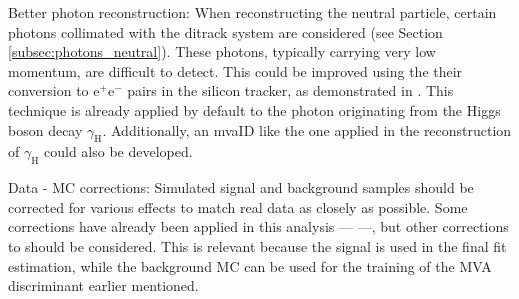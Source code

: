 \begin{myitemlist}
    \item[Better photon reconstruction:] When reconstructing the neutral particle, certain photons collimated with the ditrack system are considered (see Section \ref{subsec:photons_neutral}). These photons, typically carrying very low momentum, are difficult to detect. This could be improved using the their conversion to e$^+$e$^-$ pairs in the silicon tracker, as demonstrated in \cite{CMS:2018vgf}. This technique is already applied by default to the photon originating from the Higgs boson decay $\gamma_{\text{H}}$. Additionally, an mvaID like the one applied in the reconstruction of $\gamma_{\text{H}}$ could also be developed.
    
    \item[Data - MC corrections:] Simulated signal and background samples should be corrected for various effects to match real data as closely as possible. Some corrections have already been applied in this analysis ---  ---, but other corrections to  should be considered. This is relevant because the signal is used in the final fit estimation, while the background MC can be used for the training of the MVA discriminant earlier mentioned.




\end{myitemlist}
